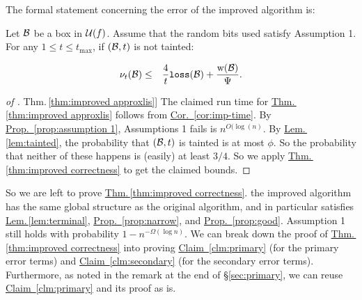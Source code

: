 \documentclass{acmsmall}
\newcommand{\cB}{{\cal B}}
\newcommand{\cU}{{\cal U}}
\newcommand{\Sec}[1]{\hyperref[sec:#1]{\S\ref*{sec:#1}}} %
\newcommand{\Thm}[1]{\hyperref[thm:#1]{Thm.\,\ref*{thm:#1}}} %
\newcommand{\Lem}[1]{\hyperref[lem:#1]{Lem.\,\ref*{lem:#1}}} %
\newcommand{\Prop}[1]{\hyperref[prop:#1]{Prop.~\ref*{prop:#1}}} %
\newcommand{\Cor}[1]{\hyperref[cor:#1]{Cor.~\ref*{cor:#1}}} %
\newcommand{\Clm}[1]{\hyperref[clm:#1]{Claim~\ref*{clm:#1}}} %
\newcommand{\loss}{{\tt loss}}
\newcommand{\taintprob}{\phi}
\newcommand{\width}{{\bf {\rm  w}}}
\newcommand{\errorcont}{\Psi}
\newcommand{\liserror}{\nu}
\begin{document}
The formal statement concerning the error of the improved algorithm is:

\begin{theorem}
\label{thm:improved correctness}
Let $\cB$ be a box in $\cU(f)$.
Assume that the random bits used satisfy Assumption 1.
For any $1 \leq t \leq t_{\max}$, if $(\cB,t)$ is not tainted:

\begin{eqnarray*}
\liserror_t(\cB) & \leq & \frac{4}{t}\loss(\cB)+\frac{\width(\cB)}{\errorcont}.
\end{eqnarray*}
\end{theorem}

\begin{proof}[of \Thm{improved approxlis}]  The claimed run time for
\Thm{improved approxlis} follows from \Cor{imp-time}.  By \Prop{assumption 1},
Assumptions 1 fails is $n^{O(\log(n)}$.  By \Lem{tainted}, the probability
that $(\cB,t)$ is tainted is at most $\taintprob$. So the probability that neither of these happens
is (easily) at least $3/4$.  So we apply
\Thm{improved correctness} to get the claimed bounds.
\end{proof}



So we are left to prove  \Thm{improved correctness}.
the improved algorithm has the same global structure as the original algorithm, and in particular
satisfies \Lem{terminal}, \Prop{narrow}, and \Prop{good}.  Assumption 1 still holds with probability $1-n^{-\Omega(\log n)}$.
We can break down the proof of \Thm{improved correctness} into proving \Clm{primary} (for the primary error terms)
and \Clm{secondary} (for the secondary error terms).
Furthermore, as noted in the remark at the end of \Sec{primary}, 
we can reuse \Clm{primary} and its proof as is.
\end{document}
